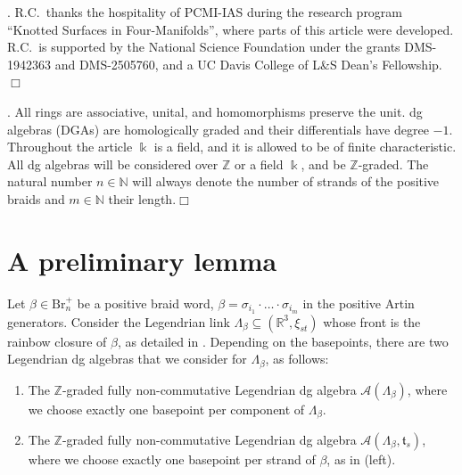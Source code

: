 \documentclass[11pt]{article}
\newcommand{\kk}{\Bbbk}
\newcommand{\ZZ}{\mathbb Z}
\newcommand{\RR}{\mathbb R}
\newcommand{\La}{\Lambda}
\newcommand{\SA}{\mathcal A}
\newcommand{\ST}{\mathfrak t}
\newcommand{\sse}{\subseteq}
\begin{document}
. R.C.~thanks the hospitality of PCMI-IAS during the research program ``Knotted Surfaces in Four-Manifolds'', where parts of this article were developed. R.C.~is supported by the National Science Foundation under the grants DMS-1942363 and DMS-2505760, and a UC Davis College of L\&S Dean's Fellowship.\hfill$\Box$

\vspace{0.5cm}
. All rings are associative, unital, and homomorphisms preserve the
unit. dg algebras (DGAs) are homologically graded and their differentials have degree
\(-1\). Throughout the article $\kk$ is a field, and it is allowed to be of finite characteristic. All dg algebras will be considered over $\ZZ$ or a field $\kk$, and be $\ZZ$-graded. The natural number $n\in\mathbb{N}$ will always denote the number of strands of the positive braids and $m\in\mathbb{N}$ their length.\hfill$\Box$
\section{A preliminary lemma}\label{sec:preliminary}


Let $\beta\in\mbox{Br}_n^+$ be a positive braid word, $\beta=\sigma_{i_1}\cdot\ldots\cdot\sigma_{i_m}$ in the positive Artin generators. Consider the Legendrian link $\La_\beta\sse(\RR^3,\xi_{st})$ whose front is the rainbow closure of $\beta$, as detailed in \cite[Section 2.2]{CasalsNg}. Depending on the basepoints, there are two Legendrian dg algebras that we consider for $\La_\beta$, as follows:

\begin{enumerate}[label=$(\roman*)$]
    \item The $\ZZ$-graded fully non-commutative Legendrian dg algebra $\SA(\La_\beta)$, where we choose exactly one basepoint per component of $\La_\beta$.

    \item The $\ZZ$-graded fully non-commutative Legendrian dg algebra $\SA(\La_\beta,\ST_{s})$, where we choose exactly one basepoint per strand of $\beta$, as in (left).
\end{enumerate}
\end{document}
